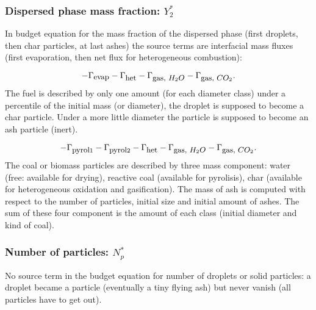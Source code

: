 \subsubsection{Dispersed phase mass fraction: $Y_{2}^{*}$}

In budget equation for the mass fraction of the dispersed phase (first droplets,
then char particles, at last ashes) the source terms are interfacial mass fluxes
(first evaporation, then net flux for heterogeneous combustion):

\begin{equation}
     -\Gamma_{\mbox{\small evap}}-\Gamma_{\mbox{\small het}}-\Gamma_{\mbox{\small gas, $H_{2}O$}}-\Gamma_{\mbox{\small gas, $CO_2$}}.
\end{equation}
The fuel is described by only one amount (for each diameter class) under a
percentile of the initial mass (or diameter), the droplet is supposed to become
a char particle. Under a more little diameter the particle is supposed to become
an ash particle (inert).

\begin{equation}
     -\Gamma_{\mbox{\small pyrol}1}-\Gamma_{\mbox{\small pyrol}2}-\Gamma_{\mbox{\small het}}-\Gamma_{\mbox{\small gas, $H_{2}O$}}-\Gamma_{\mbox{\small gas, $CO_2$}}.
\end{equation}
The coal or biomass particles are described by three mass component: water
(free: available for drying), reactive coal (available for pyrolisis), char
(available for heterogeneous oxidation and gasification). The mass of ash is
computed with respect to the number of particles, initial size and initial
amount of ashes. The sum of these four component is the amount of each class
(initial diameter and kind of coal).
          
\subsubsection{Number of particles: $N_{p}^{*}$}
No source term in the budget equation for number of droplets or solid particles: a droplet became a particle (eventually a tiny flying ash) but never vanish
(all particles have to get out).

                                
